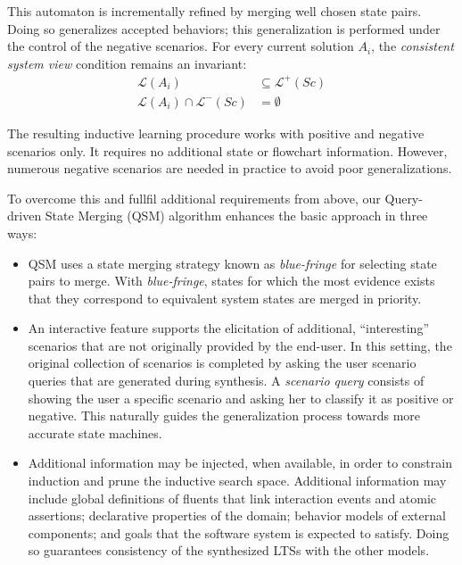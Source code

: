This automaton is incrementally refined by merging well chosen state pairs. Doing so generalizes accepted behaviors; this generalization is performed under the control of the negative scenarios. For every current solution $A_i$, the \emph{consistent system view} condition remains an invariant:
\begin{align*}
\mathcal{L}(A_i) &\subseteq \mathcal{L}^+(Sc)\\
\mathcal{L}(A_i) \cap \mathcal{L}^-(Sc) &= \emptyset
\end{align*}

The resulting inductive learning procedure works with positive and negative scenarios only. It requires no additional state or flowchart information. However, numerous negative scenarios are needed in practice to avoid poor generalizations.

To overcome this and fullfil additional requirements from above, our Query-driven State Merging (QSM) algorithm enhances the basic approach in three ways:

\begin{itemize}

\item QSM uses a state merging strategy known as \emph{blue-fringe} for selecting state pairs to merge. With \emph{blue-fringe}, states for which the most evidence exists that they correspond to equivalent system states are merged in priority.

\item An interactive feature supports the elicitation of additional, ``interesting'' scenarios that are not originally provided by the end-user. In this setting, the original collection of scenarios is completed by asking the user scenario queries that are generated during synthesis. A \emph{scenario query} consists of showing the user a specific scenario and asking her to classify it as positive or negative. This naturally guides the generalization process towards more accurate state machines.

\item Additional information may be injected, when available, in order to constrain induction and prune the inductive search space. Additional information may include global definitions of fluents that link interaction events and atomic assertions; declarative properties of the domain; behavior models of external components; and goals that the software system is expected to satisfy. Doing so guarantees consistency of the synthesized LTSs with the other models. 

\end{itemize}

